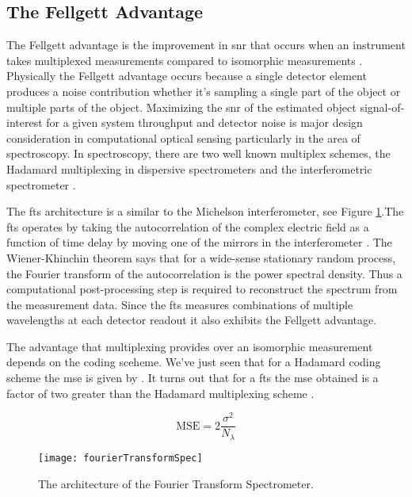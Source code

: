 \subsection{The Fellgett Advantage}

The \gls{Fellgett advantage} is the improvement in \gls{snr} that occurs when an instrument takes multiplexed measurements compared to isomorphic measurements \cite{fellgett1958principes, davis2001fourier}. Physically the \gls{Fellgett advantage}  occurs because a single detector element produces a noise contribution whether it's sampling a single part of the object or multiple parts of the object. Maximizing the \acrfull{snr} of the estimated object signal-of-interest for a given system throughput and detector noise is major design consideration in computational optical sensing particularly in the area of spectroscopy. In spectroscopy, there are two well known multiplex schemes, the Hadamard multiplexing in dispersive spectrometers and the interferometric spectrometer . 

The \gls{fts} architecture is a similar to the Michelson interferometer, see Figure \ref{fig:fourierTransformSpec}.The \gls{fts} operates by taking the autocorrelation of the complex electric field as a function of time delay by moving one of the mirrors in the interferometer \cite{davis2001fourier}. The Wiener-Khinchin theorem says that for a wide-sense stationary random process, the Fourier transform of the autocorrelation is the power spectral density. Thus a computational post-processing step is required to reconstruct the spectrum from the measurement data. Since the \gls{fts} measures combinations of multiple wavelengths at each detector readout it also exhibits the \gls{Fellgett advantage}.

The advantage that multiplexing provides over an isomorphic measurement depends on the coding sceheme. We've just seen that for a Hadamard coding scheme the \gls{mse} is given by . It turns out that for a \gls{fts} the \gls{mse} obtained is a factor of two greater than the Hadamard multiplexing scheme \cite{tai1976fourier}. 

\begin{equation}
	\text{MSE} = 2 \frac{\sigma^2}{N_{\lambda}} 
\end{equation}

\begin{figure}
    \centering
    \texttt{[image: fourierTransformSpec]}
    \caption{The architecture of the Fourier Transform Spectrometer.}
    \label{fig:fourierTransformSpec}
\end{figure}

